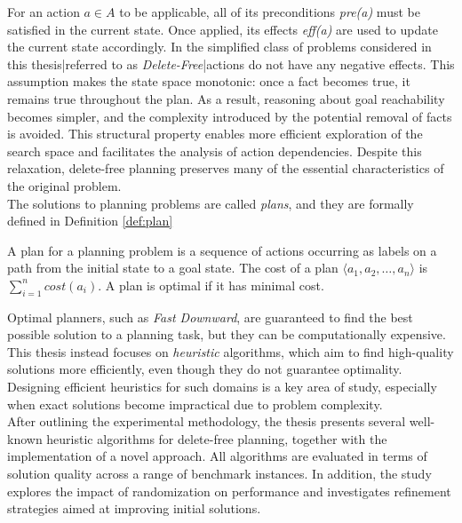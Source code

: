 For an action $a \in A$ to be applicable, all of its preconditions
\textit{pre(a)} must be satisfied in the current state. Once applied, its effects
\textit{eff(a)} are used to update the current state accordingly.
In the simplified class of problems considered in this thesis|referred to as \textit{Delete-Free}|actions do not have any negative effects.
This assumption makes the state space monotonic: once a fact becomes true, it remains true throughout the plan.
As a result, reasoning about goal reachability becomes simpler, and the complexity introduced by the potential removal of facts is avoided.
This structural property enables more efficient exploration of the search space and facilitates the analysis of action dependencies.
Despite this relaxation, delete-free planning preserves many of the essential characteristics of the original problem.\\
The solutions to planning problems are called \textit{plans}, and they are formally defined in Definition \ref{def:plan}

\begin{definition}[Plan]
	\label{def:plan}
	A plan for a planning problem is a sequence of actions occurring as labels on a path
	from the initial state to a goal state.
	The cost of a plan $\langle a_1, a_2, \dots, a_n \rangle$ is $\sum_{i = 1}^n cost(a_i)$.
	A plan is optimal if it has minimal cost.
\end{definition}

Optimal planners, such as \textit{Fast Downward}, are guaranteed to find the best possible solution to a planning task, but they can be
computationally expensive. This thesis instead focuses on \textit{heuristic} algorithms, which aim to find high-quality solutions more efficiently,
even though they do not guarantee optimality.
Designing efficient heuristics for such domains is a key area of study, especially when exact solutions become impractical due to problem complexity.\\
After outlining the experimental methodology, the thesis presents several well-known heuristic algorithms for delete-free planning,
together with the implementation of a novel approach.
All algorithms are evaluated in terms of solution quality across a range of benchmark instances. In addition, the study explores the impact of
randomization on performance and investigates refinement strategies aimed at improving initial solutions.

